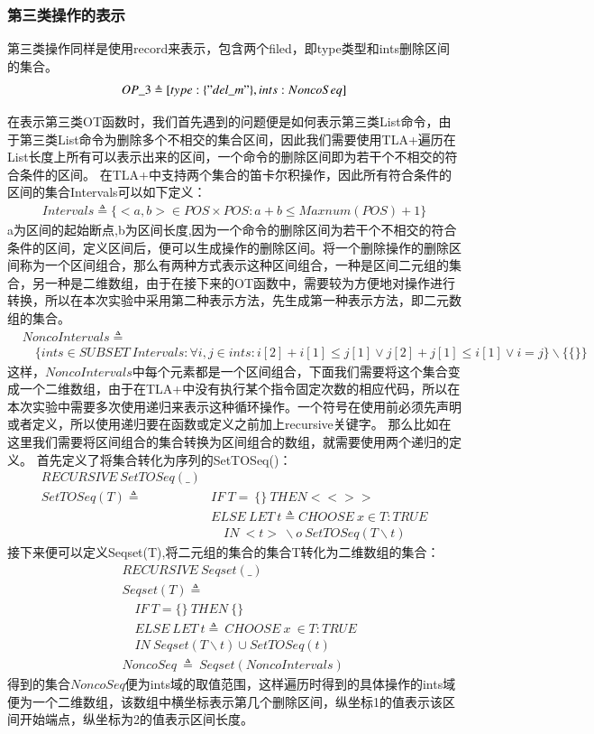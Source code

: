 \subsubsection{第三类操作的表示}
第三类操作同样是使用record来表示，包含两个filed，即type类型和ints删除区间的集合。
\begin{align*}
OP\_3 \triangleq [type:\{"del\_m"\},ints:NoncoSeq] 
\end{align*}

在表示第三类OT函数时，我们首先遇到的问题便是如何表示第三类List命令，由于第三类List命令为删除多个不相交的集合区间，因此我们需要使用TLA+遍历在List长度上所有可以表示出来的区间，一个命令的删除区间即为若干个不相交的符合条件的区间。
在TLA+中支持两个集合的笛卡尔积操作，因此所有符合条件的区间的集合Intervals可以如下定义：
\begin{align*}
Intervals \triangleq \{<a,b> \in POS \times POS: a+b \le Maxnum(POS)+1 \}
\end{align*}
a为区间的起始断点,b为区间长度,因为一个命令的删除区间为若干个不相交的符合条件的区间，定义区间后，便可以生成操作的删除区间。将一个删除操作的删除区间称为一个区间组合，那么有两种方式表示这种区间组合，一种是区间二元组的集合，另一种是二维数组，由于在接下来的OT函数中，需要较为方便地对操作进行转换，所以在本次实验中采用第二种表示方法，先生成第一种表示方法，即二元数组的集合。
\begin{align*}
& NoncoIntervals \triangleq \\ 
& \quad \{ints \in SUBSET \ Intervals : \forall i,j \in ints: i[2]+i[1] \le j[1] \lor j[2]+j[1] \le i[1] \lor i=j\} \backslash \{\{\}\}
\end{align*}
这样，$NoncoIntervals$中每个元素都是一个区间组合，下面我们需要将这个集合变成一个二维数组，由于在TLA+中没有执行某个指令固定次数的相应代码，所以在本次实验中需要多次使用递归来表示这种循环操作。一个符号在使用前必须先声明或者定义，所以使用递归要在函数或定义之前加上recursive关键字。
那么比如在这里我们需要将区间组合的集合转换为区间组合的数组，就需要使用两个递归的定义。
首先定义了将集合转化为序列的SetTOSeq()：
\begin{align*}
RECURSIVE\ SetTOSeq(\_)\\
SetTOSeq(T) \triangleq &IF\ T =\ \{\}\ THEN <<>>\\
                       & ELSE\ LET\ t \triangleq CHOOSE\ x \in T : TRUE\\
                        & \quad IN\ <t>\ \backslash o\ SetTOSeq(T \backslash {t})
\end{align*}
接下来便可以定义Seqset(T),将二元组的集合的集合T转化为二维数组的集合：
\begin{align*}
&RECURSIVE\ Seqset(\_)\\
&Seqset(T) \triangleq  \\
& \quad IF\ T = \{\}\ THEN\ \{\}\\
& \quad ELSE\ LET\ t\triangleq\ CHOOSE\ x\ \in T : TRUE\\
& \quad IN\ Seqset(T \backslash {t}) \cup {SetTOSeq(t)} \\
&NoncoSeq\ \triangleq\ Seqset(NoncoIntervals)
\end{align*}
得到的集合$NoncoSeq$便为ints域的取值范围，这样遍历时得到的具体操作的ints域便为一个二维数组，该数组中横坐标表示第几个删除区间，纵坐标1的值表示该区间开始端点，纵坐标为2的值表示区间长度。

